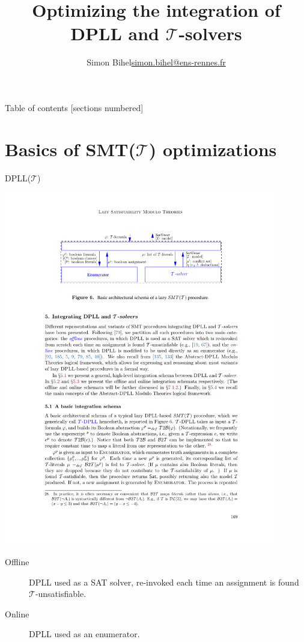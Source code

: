 \documentclass{beamer}
\title{Optimizing the integration of DPLL and $\mathcal{T}$-solvers}
\date{\displaydate{defensedate}}
\author{%
  Simon Bihel\hfill\url{simon.bihel@ens-rennes.fr} \\
}
\institute{%
  University of Rennes I \\
  \'Ecole Normale Sup\'erieure de Rennes
}
\begin{document}
\maketitle

\begin{frame}{Table of contents}
  [sections numbered]
  \tableofcontents[hideallsubsections]
\end{frame}


\section{Basics of SMT($\mathcal{T}$) optimizations}

\begin{frame}{DPLL($\mathcal{T}$)}
  \begin{center}
    \includegraphics[width=0.9\textwidth]{LazySurvey_fig6}
  \end{center}
  \begin{description}
    \item[Offline] DPLL used as a SAT solver, re-invoked each time an assignment is found $\mathcal{T}$-unsatisfiable.
    \item[Online] DPLL used as an enumerator.
  \end{description}
\end{frame}
\end{document}
